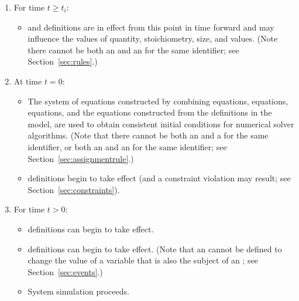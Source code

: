 \begin{enumerate}
\begin{itemize}
  \end{itemize}
  
\item For time $t \geq t_i$:
  \begin{itemize}
    
  \item \AssignmentRule and \AlgebraicRule definitions are in
    effect from this point in time forward and may influence the
    values of \Species quantity, \SpeciesReference stoichiometry,
    \Compartment size, and \Parameter
    values.  (Note there cannot be both an \AssignmentRule and an
    \InitialAssignment for the same identifier; see
    Section~\ref{sec:rules}.)

  \end{itemize}
  
\item At time $t = 0$:
  \begin{itemize}  
    
  \item The system of equations constructed by combining
    \AssignmentRule equations, \AlgebraicRule equations, \RateRule
    equations, and the equations constructed from the \Reaction
    definitions in the model, are used to obtain consistent
    initial conditions for numerical solver algorithms.  (Note
    that there cannot be both an \AssignmentRule and a \RateRule
    for the same identifier, or both an \AssignmentRule and an
    \InitialAssignment for the same identifier; see
    Section~\ref{sec:assignmentrule}.)
    
  \item \Constraint definitions begin to take effect (and a
    constraint violation may result; see
    Section~\ref{sec:constraints}).

  \end{itemize}
  
\item For time $t > 0$:
  \begin{itemize}
    
  \item \RateRule definitions can begin to take effect.
    
  \item \Event definitions can begin to take effect.  (Note that
    an \Event cannot be defined to change the value of a variable
    that is also the subject of an \AssignmentRule; see
    Section~\ref{sec:events}.)

  \item System simulation proceeds.

  \end{itemize}

\end{enumerate}  

